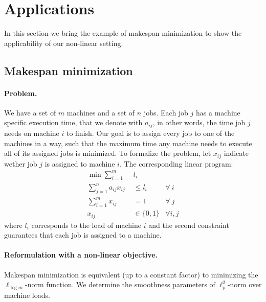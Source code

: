 
\section{Applications} \label{appix-applications}

In this section we bring the example of makespan minimization to show the applicability of our non-linear setting.

\subsection{Makespan minimization}

\paragraph{Problem.}
We have a set of $m$ machines and a set of $n$ jobs. Each job $j$ has a machine specific execution time, that we denote with $a_{ij}$, in other words, the time job $j$ needs on machine $i$ to finish. Our goal is to assign every job to one of the machines in a way, such that the maximum time any machine needs to execute all of its assigned jobs is minimized. To formalize the problem, let $x_{ij}$ indicate wether job $j$ is assigned to machine $i$. The corresponding linear program:
%
\begin{align*}
    \min \sum_{i = 1}^{m}\ \ & l_i \\
    \sum_{j = 1}^{n} a_{ij} x_{ij} &\le l_i & \forall\ i \\
    \sum_{i=1}^{m} x_{ij} & = 1 & \forall\ j \\
    x_{ij} & \in \{0,1\} & \forall i,j
\end{align*}
%
where $l_i$ corresponds to the load of machine $i$ and the second constraint guarantees that each job is assigned to a machine.

\paragraph{Reformulation with a non-linear objective.}
Makespan minimization is equivalent (up to a constant factor) to minimizing the $\ell_{\log m}$-norm function.
We determine the smoothness parameters of $\ell_{p}^{2}$-norm over machine loads.

